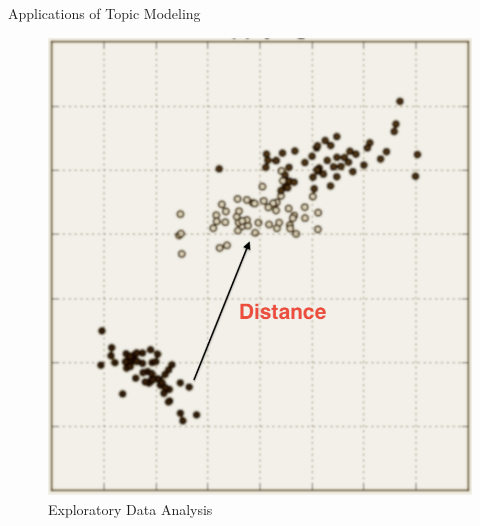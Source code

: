 \documentclass[10pt]{beamer}
\begin{document}
\begin{frame}{Applications of Topic Modeling}
\begin{multicols}{4}
    \columnbreak

  \hfill
    \begin{figure}
  \includegraphics[width=\columnwidth]{dist.png}
  \caption{Exploratory Data Analysis}
  \end{figure}
    \columnbreak


\end{multicols}
\end{frame}
\end{document}
